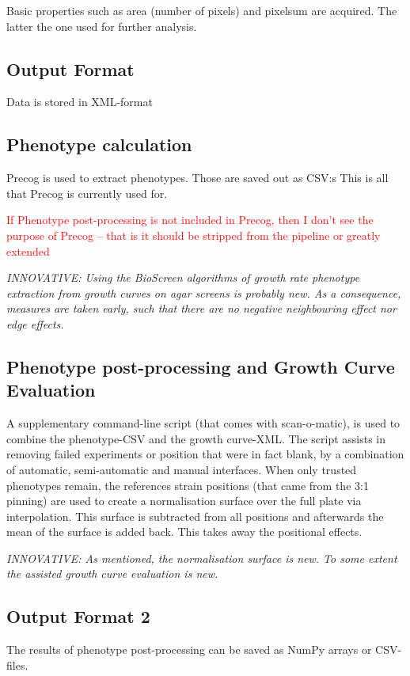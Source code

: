 \documentclass{article}
\newcommand{\comment}[1]{\textcolor{red}{#1}}
\newcommand{\innovative}[1]{\emph{INNOVATIVE: #1}}
\begin{document}
Basic properties such as area (number of pixels) and pixelsum are acquired.
The latter the one used for further analysis.

\subsection{Output Format}

Data is stored in XML-format

\subsection{Phenotype calculation}

Precog is used to extract phenotypes. Those are saved out as CSV:s
This is all that Precog is currently used for.

\comment{If Phenotype post-processing is not included in Precog, then
I don't see the purpose of Precog -- that is it should be stripped from
the pipeline or greatly extended}

\innovative{Using the BioScreen algorithms of growth rate phenotype 
extraction from growth curves on agar screens is probably new.
As a consequence, measures are taken early, such that there are no
negative neighbouring effect nor edge effects.}

\subsection{Phenotype post-processing and Growth Curve Evaluation}

A supplementary command-line script (that comes with scan-o-matic),
is used to combine the phenotype-CSV and the growth curve-XML.
The script assists in removing failed experiments or position that were
in fact blank, by a combination of automatic, semi-automatic and manual
interfaces.
When only trusted phenotypes remain, the references strain positions
(that came from the 3:1 pinning) are used to create a normalisation
surface over the full plate via interpolation.
This surface is subtracted from all positions and afterwards the 
mean of the surface is added back.
This takes away the positional effects.

\innovative{As mentioned, the normalisation surface is new.
To some extent the assisted growth curve evaluation is new.}

\subsection{Output Format 2}

The results of phenotype post-processing can be saved as NumPy
arrays or CSV-files.
\end{document}
